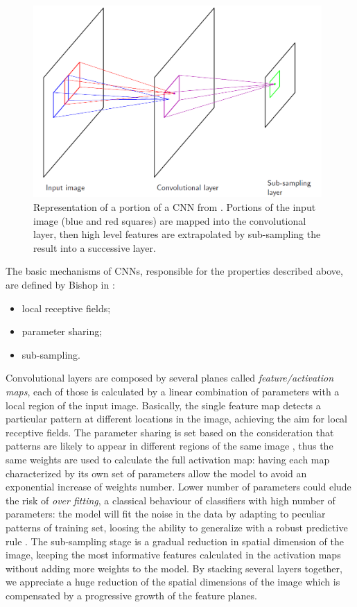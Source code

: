 \documentclass[../main.tex]{subfiles}
\begin{document}
\begin{figure}[H] 
\begin{center}
\includegraphics[width=11cm]{images/cnn-layer.png}
\caption{\small{Representation of a portion of a  CNN from \cite{bishop2006pattern}. Portions of the input image (blue and red squares) are mapped into the convolutional layer, then high level features are extrapolated by sub-sampling the result into a successive layer. }}\label{fig:cnn}
\end{center}
\end{figure}
The basic mechanisms of CNNs, responsible for the properties described above, are defined by Bishop in \cite{bishop2006pattern}:

\begin{itemize}
    \item local receptive fields;
    \item parameter sharing;
    \item sub-sampling.
\end{itemize}

Convolutional layers are composed by several planes called \textit{feature/activation maps}, each of those is calculated by a linear combination of parameters with a local region of the input image.
Basically, the single feature map detects a particular pattern at different locations in the image, achieving the aim for local receptive fields.
The parameter sharing is set based on the consideration that patterns are likely to appear in different regions of the same image \cite{o2015introduction-cnn}, thus the same weights are used to calculate the full activation map: having each map characterized by its own set of parameters allow the model to avoid an exponential increase of weights number. 
Lower number of parameters could elude the risk of \textit{over fitting}, a classical behaviour of classifiers with high number of parameters: the model will fit the noise in the data by adapting to peculiar patterns of training set, loosing the ability to generalize with a robust predictive rule \cite{dietterich1995overfitting}.
The sub-sampling stage is a  gradual reduction in spatial dimension of the image, keeping the most informative features calculated in the activation maps without adding more weights to the model.
By stacking several layers together, we appreciate a huge reduction of the spatial dimensions of the image which is compensated by a progressive growth of the feature planes.
\end{document}
